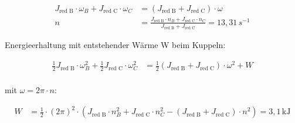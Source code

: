 \begin{bspbox}
    \begin{align*}
        J_{\text{red B}} \cdot \omega_B + J_{\text{red C}} \cdot \omega_C &= (J_{\text{red B}} + J_{\text{red C}}) \cdot \omega \\
        n &= \frac{J_{\text{red B}} \cdot n_B + J_{\text{red C}} \cdot n_C}{J_{\text{red B}} + J_{\text{red C}}} = 13{,}31\,s^{-1}
    \end{align*}

    Energieerhaltung mit entstehender Wärme W beim Kuppeln:

    \begin{align*}
        \frac{1}{2} J_{\text{red B}} \cdot \omega_B^2 + \frac{1}{2} J_{\text{red C}} \cdot \omega_C^2 &= \frac{1}{2} (J_{\text{red B}} + J_{\text{red C}}) \cdot \omega^2 + W \\
    \end{align*}

    mit $\omega = 2\pi \cdot n$:
    
    \begin{align*}
        W &= \frac{1}{2} \cdot (2\pi)^2 \cdot \left( J_{\text{red B}} \cdot n_B^2 + J_{\text{red C}} \cdot n_C^2 - (J_{\text{red B}} + J_{\text{red C}}) \cdot n^2 \right) = 3{,}1\,\text{kJ}
    \end{align*}

\end{bspbox}